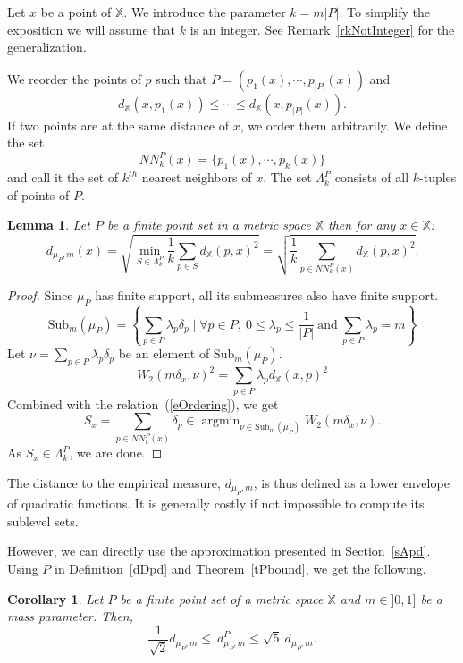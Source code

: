 \documentclass[a4paper]{article}
\newcommand\dmP{d_{\mu_P,m}}
\newcommand\dPP{d_{\mu_P,m}^P}
\newcommand\X{\mathbb{X}}
\newcommand\dX[2]{d_\X(#1,#2)}
\newcommand\Sub[2]{\mathrm{Sub}_#1(#2)}
\newtheorem{lemma}[theorem]{Lemma}
\newtheorem{corollary}[theorem]{Corollary}
\DeclareMathOperator\argmin{argmin}
\begin{document}
Let $x$ be a point of $\X$. 
We introduce the parameter $k=m|P|$.
To simplify the exposition we will assume that $k$ is an integer.
See Remark~\ref{rkNotInteger} for the generalization.

We reorder the points of $p$ such that $P=(p_1(x),\cdots,p_{|P|}(x))$ and 
\begin{equation}\label{eOrdering}
  \dX{x}{p_1(x)}\leq\cdots\leq\dX{x}{p_{|P|}(x)}.
\end{equation}
If two points are at the same distance of $x$, we order them arbitrarily.
We define the set 
\[
  NN_k^P(x)=\{p_1(x),\cdots,p_k(x)\}
\]
and call it the set of $k^{th}$ nearest neighbors of $x$.
The set $\Lambda_k^P$ consists of all $k$-tuples of points of $P$.

\begin{lemma}\label{Ewriting}
Let $P$ be a finite point set in a metric space $\X$ then for any $x\in\X$:
$$\dmP(x)=\sqrt{\min_{S\in\Lambda_k^P}\frac{1}{k}\sum_{p\in S}\dX{p}{x}^2}=\sqrt{\frac{1}{k}\sum_{p\in NN_k^P(x)}\dX{p}{x}^2}.$$
\end{lemma}

\begin{proof}
Since $\mu_P$ has finite support, all its submeasures also have finite support.
\[
  \Sub{m}{\mu_P}=\left\{\sum_{p\in P}\lambda_p\delta_p\mid \forall p\in P,\ 0\leq\lambda_p\leq \frac{1}{|P|} \ \mathrm{and}\ \sum_{p\in P}\lambda_p=m\right\}
\]
Let $\nu=\sum_{p\in P}\lambda_p\delta_p$ be an element of $\Sub{m}{\mu_P}$.
$$W_2(m\delta_x,\nu)^2=\sum_{p\in P}\lambda_p\dX{x}{p}^2$$
Combined with the relation~(\ref{eOrdering}), we get
\[
  S_x=\sum_{p\in NN_k^P(x)}\delta_p\in\argmin_{\nu\in\Sub{m}{\mu_P}}W_2(m\delta_x,\nu).
\]
As $S_x\in\Lambda_k^P$, we are done.
\end{proof}

The distance to the empirical measure, $\dmP$, is thus defined as a lower envelope of quadratic functions.
It is generally costly if not impossible to compute its sublevel sets.

However, we can directly use the approximation presented in Section~\ref{sApd}.
Using $P$ in Definition~\ref{dDpd} and Theorem~\ref{tPbound}, we get the following.

\begin{corollary}\label{cPbound}
Let $P$ be a finite point set of a metric space $\X$ and $m\in]0,1]$ be a mass parameter.
Then,
$$\frac{1}{\sqrt{2}}\dmP\leq\ \dPP\leq\sqrt{5}\ \dmP.$$
\end{corollary}
\end{document}
